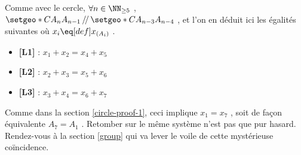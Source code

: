 \medskip

Comme avec le cercle, $\forall n \in \NN_{\geq 5}$ , 
$\setgeo*{C}{A_{n} A_{n-1}} \,/\!/\, \setgeo*{C}{A_{n-3} A_{n-4}}$ , et l'on en déduit ici les égalités suivantes où $x_i \eq[def] x_{(A_i)}$ .
\begin{itemize}[label=\small\textbullet]
	\item \textbf{[L1]} : 
	      $x_1 + x_{2} = x_{4} + x_{5}$

	\item \textbf{[L2]} : 
	      $x_2 + x_{3} = x_{5} + x_{6}$

	\item \textbf{[L3]} : 
	      $x_3 + x_{4} = x_{6} + x_{7}$
\end{itemize}


\medskip

Comme dans la section \ref{circle-proof-1}, ceci implique $x_1 = x_7$ , soit de façon équivalente $A_7 = A_1$ . Retomber sur le même système n'est pas que pur hasard. Rendez-vous à la section \ref{group} qui va lever le voile de cette mystérieuse coïncidence.
